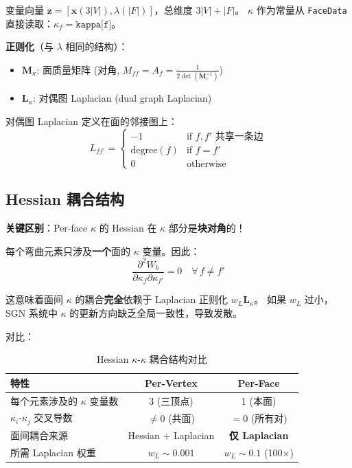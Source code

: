 \documentclass[12pt,a4paper]{article}
\begin{document}
变量向量 $\mathbf{z} = [\mathbf{x}(3|V|), \lambda(|F|)]$，总维度 $3|V| + |F|$。
$\kappa$ 作为常量从 \texttt{FaceData} 直接读取：$\kappa_f = \texttt{kappa[f]}$。

\textbf{正则化}（与 $\lambda$ 相同的结构）：
\begin{itemize}
    \item $\mathbf{M}_\kappa$: 面质量矩阵 (对角, $M_{ff} = A_f = \frac{1}{2\det(\mathbf{M}_r^{-1})}$)
    \item $\mathbf{L}_\kappa$: 对偶图 Laplacian (dual graph Laplacian)
\end{itemize}

对偶图 Laplacian 定义在面的邻接图上：
\begin{equation}
    L_{ff'} = \begin{cases}
        -1 & \text{if } f, f' \text{ 共享一条边} \\
        \text{degree}(f) & \text{if } f = f' \\
        0 & \text{otherwise}
    \end{cases}
\end{equation}

\subsection{Hessian 耦合结构}

\begin{framed}
\noindent\textbf{关键区别}：Per-face $\kappa$ 的 Hessian 在 $\kappa$ 部分是\textbf{块对角}的！

每个弯曲元素只涉及\textbf{一个}面的 $\kappa$ 变量。因此：
\begin{equation}
    \frac{\partial^2 W_b}{\partial \kappa_f \partial \kappa_{f'}} = 0
    \quad \forall\, f \neq f'
\end{equation}

这意味着面间 $\kappa$ 的耦合\textbf{完全}依赖于 Laplacian 正则化 $w_L \mathbf{L}_\kappa$。
如果 $w_L$ 过小，SGN 系统中 $\kappa$ 的更新方向缺乏全局一致性，导致发散。
\end{framed}

对比：
\begin{table}[H]
\centering
\caption{Hessian $\kappa$-$\kappa$ 耦合结构对比}
\begin{tabular}{lcc}
\toprule
特性 & Per-Vertex & Per-Face \\
\midrule
每个元素涉及的 $\kappa$ 变量数 & 3 (三顶点) & 1 (本面) \\
$\kappa_i$-$\kappa_j$ 交叉导数 & $\neq 0$ (共面) & $= 0$ (所有对) \\
面间耦合来源 & Hessian + Laplacian & \textbf{仅 Laplacian} \\
所需 Laplacian 权重 & $w_L \sim 0.001$ & $w_L \sim 0.1$ (100$\times$) \\
\bottomrule
\end{tabular}
\end{table}
\end{document}
